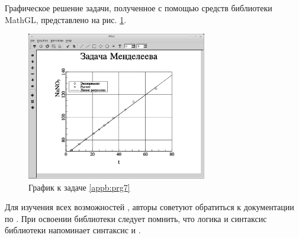 Графическое решение задачи, полученное с помощью средств библиотеки MathGL, представлено на рис. \ref{appb:refDrawing9}.

\begin{figure}[htb]
\begin{center}
\includegraphics[width=0.7\textwidth]{img/ris_appb_11}
\caption{График к задаче \ref{appb:prg7}}
\label{appb:refDrawing9}
\end{center}
\end{figure}

Для изучения всех возможностей , авторы советуют обратиться к документации по . 
При освоении библиотеки  следует помнить, что логика и синтаксис библиотеки напоминает 
синтаксис  и  .
